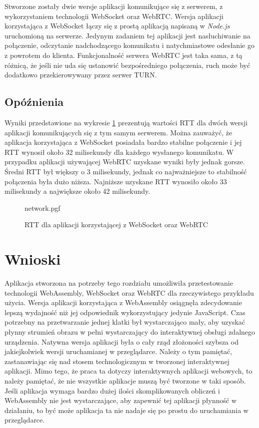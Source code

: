 \documentclass[language=polish,type=master]{aghmodern}
\begin{document}
Stworzone zostały dwie wersje aplikacji komunikujące się z serwerem, z wykorzystaniem technologii WebSocket oraz WebRTC.
Wersja aplikacji korzystająca z WebSocket łączy się z prostą aplikacją napisaną w \emph{Node.js}\footnotemark{} uruchomioną na serwerze.
Jedynym zadaniem tej aplikacji jest nasłuchiwanie na połączenie, odczytanie nadchodzącego komunikatu i natychmiastowe odesłanie go z powrotem do klienta.
Funkcjonalność serwera WebRTC jest taka sama, z tą różnicą, że jeśli nie uda się ustanowić bezpośredniego połączenia, ruch może być dodatkowo przekierowywany przez serwer TURN.

\subsection{Opóźnienia}
Wyniki przedstawione na wykresie \ref{fig:network} prezentują wartości RTT dla dwóch wersji aplikacji komunikujących się z tym samym serwerem.
Można zauważyć, że aplikacja korzystająca z WebSocket posiadała bardzo stabilne połączenie i jej RTT wynosił około 32 milisekundy dla każdego wysłanego komunikatu.
W przypadku aplikacji używającej WebRTC uzyskane wyniki były jednak gorsze.
Średni RTT był większy o 3 milisekundy, jednak co najważniejsze to stabilność połączenia była dużo niższa.
Najniższe uzyskane RTT wynosiło około 33 milisekundy a największe około 42 milisekundy.

\begin{figure}[H]
    \centering
    {network.pgf}
    \vspace*{5pt}
    \caption{RTT dla aplikacji korzystającej z WebSocket oraz WebRTC}
    \label{fig:network}
\end{figure}

\section{Wnioski}
Aplikacja stworzona na potrzeby tego rozdziału umożliwiła przetestowanie technologii WebAssembly, WebSocket oraz WebRTC dla rzeczywistego przykładu użycia.
Wersja aplikacji korzystająca z WebAssembly osiągnęła zdecydowanie lepszą wydajność niż jej odpowiednik wykorzystujący jedynie JavaScript.
Czas potrzebny na przetwarzanie jednej klatki był wystarczająco mały, aby uzyskać płynny strumień obrazu w pełni wystarczający do interaktywnej obsługi zdalnego urządzenia.
Natywna wersja aplikacji była o cały rząd złożoności szybsza od jakiejkolwiek wersji uruchamianej w przeglądarce.
Należy o tym pamiętać, zastanawiając się nad stosem technologicznym w tworzonej interaktywnej aplikacji.
Mimo tego, że praca ta dotyczy interaktywnych aplikacji webowych, to należy pamiętać, że nie wszystkie aplikacje muszą być tworzone w taki sposób.
Jeśli aplikacja wymaga bardzo dużej ilości skomplikowanych obliczeń i WebAssembly nie jest wystarczające, aby zapewnić tej aplikacji płynność w działaniu, to być może aplikacja ta nie nadaje się po prostu do uruchamiania w przeglądarce.
\end{document}
